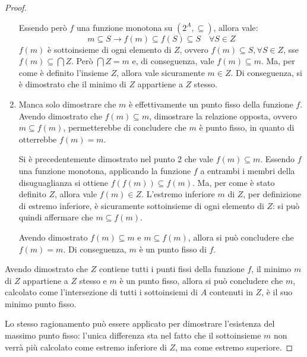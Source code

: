 \begin{thm}
\begin{proof}
\begin{enumerate}
            Essendo però $f$ una funzione monotona su $(2^A, \subseteq)$,
            allora vale:
            \[
                m \subseteq S \longrightarrow f(m) \subseteq f(S) \subseteq S \quad
                \forall S \in Z
            \]
            $f(m)$ è sottoinsieme di ogni elemento di $Z$, ovvero
            $f(m) \subseteq S, \forall S \in Z$, sse $f(m) \subseteq \bigcap Z$.
            Però $\bigcap Z = m$ e, di conseguenza, vale $f(m) \subseteq m$.
            Ma, per come è definito l'insieme $Z$, allora
            vale sicuramente $m \in Z$. Di conseguenza, si è dimostrato che il
            minimo di $Z$ appartiene a $Z$ stesso.
            \item Manca solo dimostrare che $m$ è effettivamente un punto fisso
            della funzione $f$. Avendo dimostrato che $f(m) \subseteq m$, dimostrare
            la relazione opposta, ovvero $m \subseteq f(m)$, permetterebbe
            di concludere che $m$ è punto fisso, in quanto di otterrebbe
            $f(m) = m$.

            Si è precedentemente dimostrato nel punto 2 che vale
            $f(m) \subseteq m$. Essendo $f$ una funzione monotona,
            applicando la funzione $f$ a entrambi i membri della disuguaglianza
            si ottiene $f(f(m)) \subseteq f(m)$.
            Ma, per come è stato definito $Z$, allora vale $f(m) \in Z$.
            L'estremo inferiore $m$ di $Z$, per definizione di estremo inferiore,
            è sicuramente sottoinsieme di ogni elemento di $Z$: si può quindi
            affermare che $m \subseteq f(m)$.

            Avendo dimostrato $f(m) \subseteq m$ e $m \subseteq f(m)$,
            allora si può concludere che $f(m) = m$. Di conseguenza,
            $m$ è un punto fisso di $f$.
        \end{enumerate}
        Avendo dimostrato che $Z$ contiene tutti i punti fissi della funzione $f$,
        il minimo $m$ di $Z$ appartiene a $Z$ stesso e $m$ è un punto fisso,
        allora si può concludere che $m$, calcolato come l'intersezione di
        tutti i sottoinsiemi di $A$ contenuti in $Z$, è il suo minimo
        punto fisso.

        Lo stesso ragionamento può essere applicato per dimostrare l'esistenza
        del massimo punto fisso: l'unica differenza sta nel fatto che
        il sottoinsieme $m$ non verrà più calcolato come estremo inferiore
        di $Z$, ma come estremo superiore.
    \end{proof}
\end{thm}

